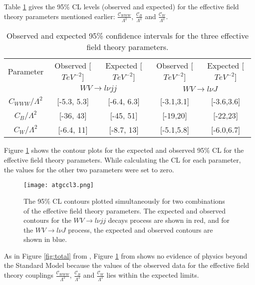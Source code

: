 \documentclass[11pt,oneside,a4paper]{article}
\begin{document}
Table \ref{table:atgccl2} gives the 95\% CL levels (observed and expected) for the effective field theory parameters mentioned earlier: $\frac{\mathcal{C}_{WWW}}{\Lambda^{2}}$, $\frac{\mathcal{C}_{B}}{\Lambda^{2}}$ and $\frac{\mathcal{C}_{W}}{\Lambda^{2}}$. 





\begin{table}[h!]
	{\centering
		\begin{tabular}{|| c | c | c | c | c ||} 
			\hline
			Parameter  & Observed [$TeV^{-2}$] & Expected [$TeV^{-2}$] & Observed [$TeV^{-2}$] & Expected [$TeV^{-2}$]  \\
			& \multicolumn{2}{c|}{$WV \rightarrow l\nu jj$} & \multicolumn{2}{c|}{$WV \rightarrow l\nu J$}\\
			\hline\hline
			$C_{WWW}/\Lambda^{2}$ & [-5.3, 5.3]  & [-6.4, 6.3] & [-3.1,3.1] & [-3.6,3.6]\\
			$C_{B}/\Lambda^{2}$ & [-36, 43]  & [-45, 51] & [-19,20] & [-22,23]  \\ 
			$C_{W}/\Lambda^{2}$ & [-6.4, 11] & [-8.7, 13] & [-5.1,5.8] & [-6.0,6.7]\\ 	[1 ex] 
			\hline
		\end{tabular}}
		\caption{Observed  and expected 95\% confidence intervals for the three effective field theory parameters.}
		\label{table:atgccl2}
\end{table}
 
 
 Figure \ref{fig:atgccl3} shows the contour plots for the expected and observed 95\% CL for the effective field theory parameters. While calculating the CL for each parameter, the values for the other two parameters were set to zero.


\begin{figure}[H]
	\texttt{[image: atgccl3.png]}
	\caption{The 95\% CL contours plotted simultaneously for two combinations of the effective field theory parameters. The expected and observed contours for the $WV \rightarrow l\nu jj$ decays process are shown in red, and for the $WV \rightarrow l\nu J$ process, the expected and observed contours are shown in blue.}
	\label{fig:atgccl3}
\end{figure}


As in Figure \ref{fig:total} from \cite{WWtgc}, Figure \ref{fig:atgccl3} from \cite{WV} shows no evidence of physics beyond the Standard Model because the values of the observed data for the effective field theory couplings $\frac{\mathcal{C}_{WWW}}{\Lambda^{2}}$, $\frac{\mathcal{C}_{B}}{\Lambda^{2}}$ and $\frac{\mathcal{C}_{W}}{\Lambda^{2}}$ lies within the expected limits.
\end{document}
